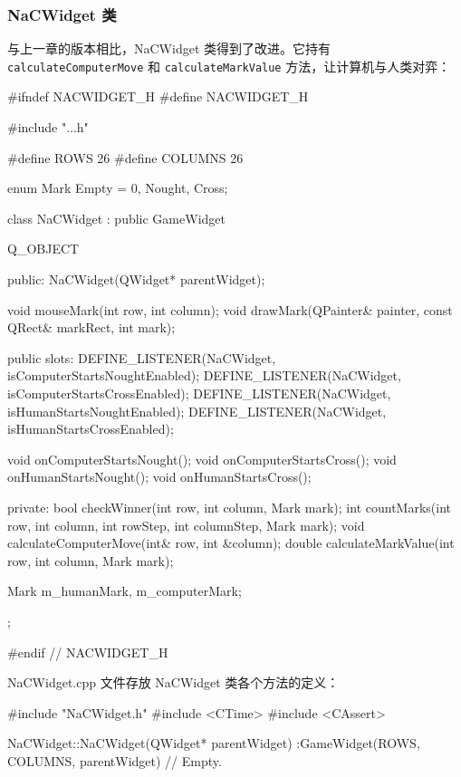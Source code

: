 \subsubsection{NaCWidget 类}

与上一章的版本相比，NaCWidget 类得到了改进。它持有 \texttt{calculateComputerMove} 和 \texttt{calculateMarkValue} 方法，让计算机与人类对弈：

\medskip{}

\begin{codebox}
#ifndef NACWIDGET_H
#define NACWIDGET_H

#include "..\MainWindow\GameWidget.h"

#define ROWS    26
#define COLUMNS 26

enum Mark {Empty = 0, Nought, Cross};

class NaCWidget : public GameWidget {
  Q_OBJECT

  public:
    NaCWidget(QWidget* parentWidget);

    void mouseMark(int row, int column);
    void drawMark(QPainter& painter,
                  const QRect& markRect, int mark);

  public slots:
    DEFINE_LISTENER(NaCWidget, isComputerStartsNoughtEnabled);
    DEFINE_LISTENER(NaCWidget, isComputerStartsCrossEnabled);
    DEFINE_LISTENER(NaCWidget, isHumanStartsNoughtEnabled);
    DEFINE_LISTENER(NaCWidget, isHumanStartsCrossEnabled);

    void onComputerStartsNought();
    void onComputerStartsCross();
    void onHumanStartsNought();
    void onHumanStartsCross();

  private:
    bool checkWinner(int row, int column, Mark mark);
    int countMarks(int row, int column, int rowStep,
                   int columnStep, Mark mark);
    void calculateComputerMove(int& row, int &column);
    double calculateMarkValue(int row, int column, Mark mark);

    Mark m_humanMark, m_computerMark;
};

#endif // NACWIDGET_H
\end{codebox}

NaCWidget.cpp 文件存放 NaCWidget 类各个方法的定义：

\medskip{}

\begin{codebox}
#include "NaCWidget.h"
#include <CTime>
#include <CAssert>

NaCWidget::NaCWidget(QWidget* parentWidget)
 :GameWidget(ROWS, COLUMNS, parentWidget) {
  // Empty.
}
\end{codebox}

